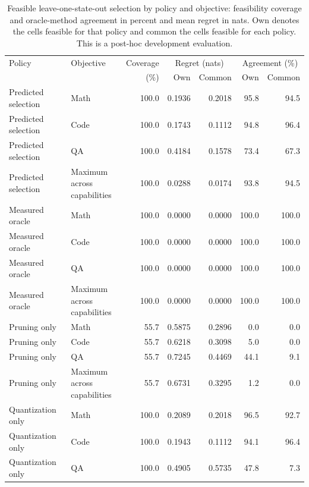 \begin{table}[!htbp]\normalfont
\centering
\small
\setlength{\tabcolsep}{3pt}
\caption{Feasible leave-one-state-out selection by policy and objective: feasibility coverage and oracle-method agreement in percent and mean regret in nats. Own denotes the cells feasible for that policy and common the cells feasible for each policy. This is a \mbox{post-hoc} development evaluation.}
\label{tab:selection-feasible}
\begin{tabular*}{\textwidth}{@{\extracolsep{\fill}}llrrrrr@{}}
\toprule
Policy & Objective & Coverage & \multicolumn{2}{c}{Regret (nats)} & \multicolumn{2}{c}{Agreement (\%)} \\
\cmidrule(lr){4-5}\cmidrule(lr){6-7}
 & & (\%) & Own & Common & Own & Common \\
\midrule
Predicted selection & Math & 100.0 & 0.1936 & 0.2018 & 95.8 & 94.5 \\
Predicted selection & Code & 100.0 & 0.1743 & 0.1112 & 94.8 & 96.4 \\
Predicted selection & QA & 100.0 & 0.4184 & 0.1578 & 73.4 & 67.3 \\
Predicted selection & \shortstack[l]{Maximum across\\capabilities} & 100.0 & 0.0288 & 0.0174 & 93.8 & 94.5 \\
\midrule
Measured oracle & Math & 100.0 & 0.0000 & 0.0000 & 100.0 & 100.0 \\
Measured oracle & Code & 100.0 & 0.0000 & 0.0000 & 100.0 & 100.0 \\
Measured oracle & QA & 100.0 & 0.0000 & 0.0000 & 100.0 & 100.0 \\
Measured oracle & \shortstack[l]{Maximum across\\capabilities} & 100.0 & 0.0000 & 0.0000 & 100.0 & 100.0 \\
\midrule
Pruning only & Math & 55.7 & 0.5875 & 0.2896 & 0.0 & 0.0 \\
Pruning only & Code & 55.7 & 0.6218 & 0.3098 & 5.0 & 0.0 \\
Pruning only & QA & 55.7 & 0.7245 & 0.4469 & 44.1 & 9.1 \\
Pruning only & \shortstack[l]{Maximum across\\capabilities} & 55.7 & 0.6731 & 0.3295 & 1.2 & 0.0 \\
\midrule
Quantization only & Math & 100.0 & 0.2089 & 0.2018 & 96.5 & 92.7 \\
Quantization only & Code & 100.0 & 0.1943 & 0.1112 & 94.1 & 96.4 \\
Quantization only & QA & 100.0 & 0.4905 & 0.5735 & 47.8 & 7.3 \\

\end{tabular*}
\end{table}
